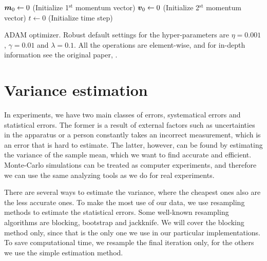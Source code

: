 \IncMargin{1em}
\begin{algorithm}
	\SetAlgoLined
	\Parameter{$\gamma_1,\gamma_2\in [0,1)$: Momentum parameters}
	
	$\boldsymbol{{m}}_0\leftarrow 0$ (Initialize 1$^{\text{st}}$ momentum vector)\;
	$\boldsymbol{{v}}_0\leftarrow 0$ (Initialize 2$^{\text{st}}$ momentum vector)\;
	$t\leftarrow 0$ (Initialize time step)\;
	\caption{ADAM optimizer. Robust default settings for the hyper-parameters are $\eta=0.001$, $\gamma=0.01$ and $\lambda=0.1$. All the operations are element-wise, and for in-depth information see the original paper, \cite{kingma_adam:_2014}.}
	\label{alg:adam}
\end{algorithm}\DecMargin{1em}

\section{Variance estimation} \label{sec:variance}
In experiments, we have two main classes of errors, systematical errors and statistical errors. The former is a result of external factors such as uncertainties in the apparatus or a person constantly takes an incorrect measurement, which is an error that is hard to estimate. The latter, however, can be found by estimating the variance of the sample mean, which we want to find accurate and efficient. Monte-Carlo simulations can be treated as computer experiments, and therefore we can use the same analyzing tools as we do for real experiments. 

There are several ways to estimate the variance, where the cheapest ones also are the less accurate ones. To make the most use of our data, we use resampling methods to estimate the statistical errors. Some well-known resampling algorithms are blocking, bootstrap and jackknife. We will cover the blocking method only, since that is the only one we use in our particular implementations. To save computational time, we resample the final iteration only, for the others we use the simple estimation method.

